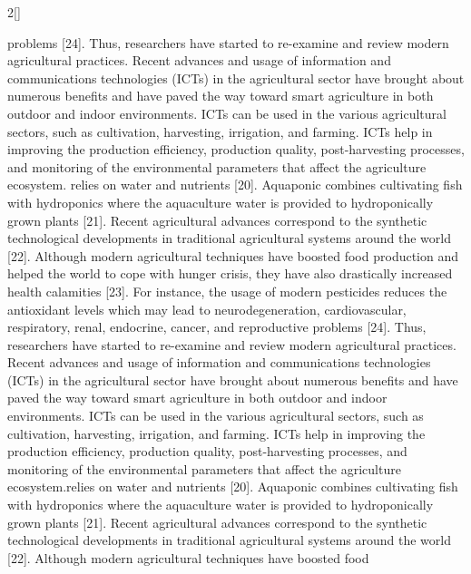 \documentclass[10pt]{article}
\begin{document}
\begin{multicols}{2}[]
{problems [24]. Thus, researchers have started to re-examine
and review modern agricultural practices.
Recent advances and usage of information and communications technologies (ICTs) in the agricultural sector have
brought about numerous benefits and have paved the way
toward smart agriculture in both outdoor and indoor environments. ICTs can be used in the various agricultural sectors, such as cultivation, harvesting, irrigation, and farming.
ICTs help in improving the production efficiency, production
quality, post-harvesting processes, and monitoring of the environmental parameters that affect the agriculture ecosystem.
relies
on water and nutrients [20]. Aquaponic combines cultivating fish with hydroponics where the aquaculture water is
provided to hydroponically grown plants [21]. Recent agricultural advances correspond to the synthetic technological
developments in traditional agricultural systems around the
world [22].
Although modern agricultural techniques have boosted food
production and helped the world to cope with hunger crisis,
they have also drastically increased health calamities [23]. For
instance, the usage of modern pesticides reduces the antioxidant levels which may lead to neurodegeneration, cardiovascular, respiratory, renal, endocrine, cancer, and reproductive
problems [24]. Thus, researchers have started to re-examine
and review modern agricultural practices.
Recent advances and usage of information and communications technologies (ICTs) in the agricultural sector have
brought about numerous benefits and have paved the way
toward smart agriculture in both outdoor and indoor environments. ICTs can be used in the various agricultural sectors, such as cultivation, harvesting, irrigation, and farming.
ICTs help in improving the production efficiency, production
quality, post-harvesting processes, and monitoring of the environmental parameters that affect the agriculture ecosystem.relies
on water and nutrients [20]. Aquaponic combines cultivating fish with hydroponics where the aquaculture water is
provided to hydroponically grown plants [21]. Recent agricultural advances correspond to the synthetic technological
developments in traditional agricultural systems around the
world [22].
Although modern agricultural techniques have boosted food

}
\end{multicols}
\end{document}
